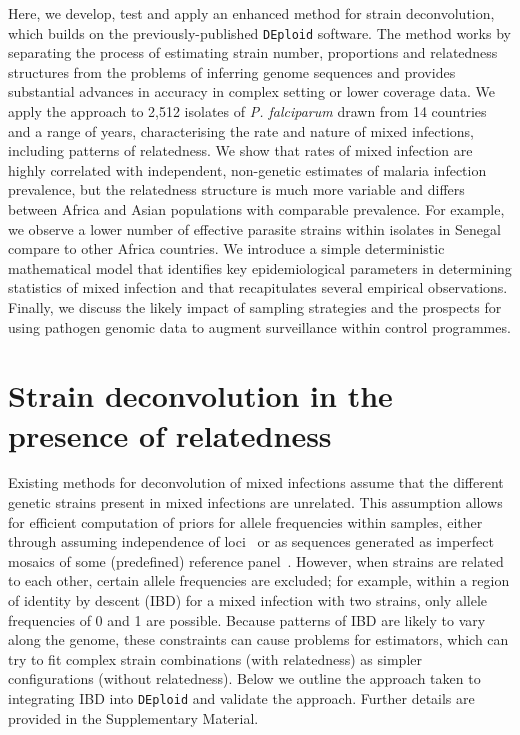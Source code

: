 \documentclass[9pt,lineno]{elife}
\begin{document}
Here, we develop, test and apply an enhanced method for strain deconvolution, which builds on the previously-published \texttt{DEploid} software.  The method works by separating the process of estimating strain number, proportions and relatedness structures from the problems of inferring genome sequences and provides substantial advances in accuracy in complex setting or lower coverage data.  We apply the approach to 2,512 isolates of {\it P. falciparum} drawn from 14 countries and a range of years, characterising the rate and nature of mixed infections, including patterns of relatedness.  We show that rates of mixed infection are highly correlated with independent, non-genetic estimates of malaria infection prevalence, but the relatedness structure is much more variable and differs between Africa and Asian populations with comparable prevalence. For example, we observe a lower number of effective parasite strains within isolates in Senegal compare to other Africa countries.  We introduce a simple deterministic mathematical model that identifies key epidemiological parameters in determining statistics of mixed infection and that recapitulates several empirical observations.  Finally, we discuss the likely impact of sampling strategies and the prospects for using pathogen genomic data to augment surveillance within control programmes.



\section{Strain deconvolution in the presence of relatedness}

Existing methods for deconvolution of mixed infections assume that the different genetic strains present in mixed infections are unrelated.  This assumption allows for efficient computation of priors for allele frequencies within samples, either through assuming independence of loci~\citep{Jack2016} or as sequences generated as imperfect mosaics of some (predefined) reference panel~\citep{Zhu2017}.  However, when strains are related to each other, certain allele frequencies are excluded; for example, within a region of identity by descent (IBD) for a mixed infection with two strains, only allele frequencies of 0 and 1 are possible.  Because patterns of IBD are likely to vary along the genome, these constraints can cause problems for estimators, which can try to fit complex strain combinations (with relatedness) as simpler configurations (without relatedness).  Below we outline the approach taken to integrating IBD into \texttt{DEploid} and validate the approach.  Further details are provided in the Supplementary Material.
\end{document}
